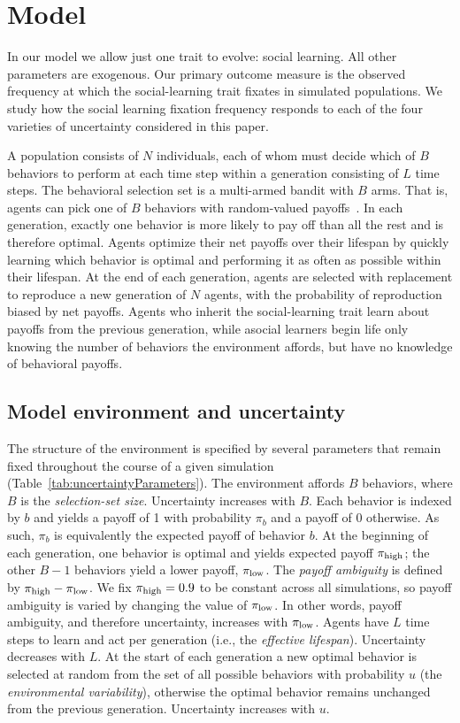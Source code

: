 \documentclass[letterpaper,11.5pt]{scrartcl}
\begin{document}
\section{Model}

In our model we allow just one trait to evolve: social learning. All other parameters are exogenous. Our primary outcome measure is the observed frequency at which the social-learning trait fixates in simulated populations. We study how the social learning fixation frequency responds to each of the four varieties of uncertainty considered in this paper. 

A population consists of $N$ individuals, each of whom must decide which of $B$ behaviors to perform at
each time step within a generation consisting of $L$ time steps. The behavioral selection set is a multi-armed bandit with $B$ arms. That is, agents can pick one of $B$ behaviors with random-valued payoffs~\citep{SuttonBartoBook,McElreath2005,Steyvers2009,Rendell2010,Schulz2019}. In each generation, exactly one behavior is more likely to pay off than all the rest and is therefore optimal. Agents optimize their net payoffs over their lifespan by quickly learning which behavior is optimal and performing it as often as possible within their lifespan. At the end of each generation, agents are selected with replacement to reproduce a new generation of $N$ agents, with the probability of reproduction biased by net payoffs. Agents who inherit the social-learning trait learn about payoffs from the previous generation, while asocial learners begin life only knowing the number of behaviors the environment affords, but have no knowledge of behavioral payoffs.


\subsection{Model environment and uncertainty}

The structure of the environment is specified by several parameters that remain fixed throughout the course of a given simulation (Table~\ref{tab:uncertaintyParameters}).  The environment affords $B$ behaviors, where $B$ is the \emph{selection-set size}. Uncertainty increases with $B$. Each behavior is indexed by $b$ and yields a payoff of 1 with probability $\pi_b$ and a payoff of 0 otherwise. As such, $\pi_b$ is equivalently the expected payoff of behavior $b$. At the beginning of each generation, one behavior is optimal and yields expected payoff $\pi_{\mathrm{high}}$; the other $B-1$ behaviors yield a lower payoff, $\pi_{\mathrm{low}}$. The \emph{payoff ambiguity} is defined by $\pi_{\mathrm{high}} - \pi_{\mathrm{low}}$. We fix $\pi_{\mathrm{high}} = 0.9$ to be constant across all simulations, so payoff ambiguity is varied by changing the value of $\pi_{\mathrm{low}}$. In other words, payoff ambiguity, and therefore uncertainty, increases with $\pi_{\mathrm{low}}$.  Agents have $L$ time steps to learn and act per generation (i.e., the \emph{effective lifespan}). Uncertainty decreases with $L$. At the start of each generation a new optimal behavior is selected at random from the set of all possible behaviors with probability $u$ (the \emph{environmental variability}), otherwise the optimal behavior remains unchanged from the previous generation. Uncertainty increases with $u$.
\end{document}
